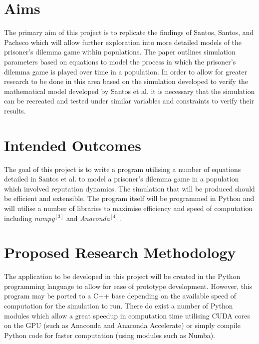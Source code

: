 \documentclass[10pt,a4paper]{article}
\begin{document}
\section{Aims}
The primary aim of this project is to replicate the findings of Santos, Santos, and Pacheco which will allow further exploration into more detailed models of the prisoner’s dilemma game within populations. The paper outlines simulation parameters based on equations to model the process in which the prisoner’s dilemma game is played over time in a population. In order to allow for greater research to be done in this area based on the simulation developed to verify the mathematical model developed by Santos et al. it is necessary that the simulation can be recreated and tested under similar variables and constraints to verify their results.
\section{Intended Outcomes}
The goal of this project is to write a program utilising a number of equations detailed in Santos et al. to model a prisoner’s dilemma game in a population which involved reputation dynamics. The simulation that will be produced should be efficient and extensible. The program itself will be programmed in Python and will utilise a number of libraries to maximise efficiency and speed of computation including \textit{numpy}$^{[3]}$ and \textit{Anaconda}$^{[4]}$. 
\section{Proposed Research Methodology}
The application to be developed in this project will be created in the Python programming language to allow for ease of prototype development. However, this program may be ported to a C++ base depending on the available speed of computation for the simulation to run.
There do exist a number of Python modules which allow a great speedup in computation time utilising CUDA cores on the GPU (such as Anaconda and Anaconda Accelerate) or simply compile Python code for faster computation (using modules such as Numba).
\end{document}
